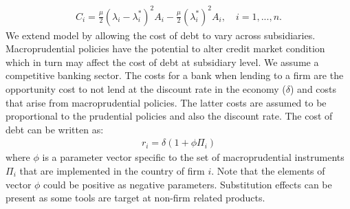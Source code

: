 \documentclass[12pt]{article}
\begin{document}
	\begin{equation}
	\begin{aligned}
	C_i=\frac{\mu}{2}(\lambda_i-\lambda_i^*)^2A_i-\frac{\mu}{2}(\lambda_i^*)^2A_i, \quad i=1,...,n.
	\end{aligned}
	\label{eq:agency cost}
	\end{equation}
	We extend \cite{huizinga2008capital} model by allowing the cost of debt to vary across subsidiaries. Macroprudential policies have the potential to alter credit market condition which in turn may affect the cost of debt at subsidiary level. We assume a competitive banking sector. The costs for a bank when lending to a firm are the opportunity cost to not lend at the discount rate in the economy ($\delta$) and costs that arise from macroprudential policies. The latter costs are assumed to be proportional to the prudential policies and also the discount rate. The cost of debt can be written as:
	  \begin{equation}
	  \begin{aligned}
	  r_i=\delta(1+\phi\Pi_i)
	  \end{aligned}
	  \label{eq:cost of debt}
	  \end{equation}
	where $\phi$ is a parameter vector specific to the set of macroprudential instruments $\Pi_i$ that are implemented in the country of firm $i$. Note that the elements of vector $\phi$ could be positive as negative parameters. Substitution effects can be present as some tools are target at non-firm related products.
\end{document}
